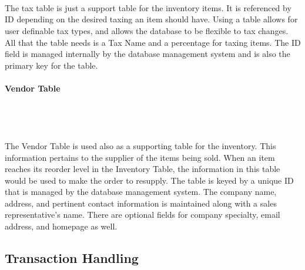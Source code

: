 \documentclass{report}
\begin{document}
    \\
    \\
    \\
    The tax table is just a support table for the inventory items. It is referenced by ID
    depending on the desired taxing an item should have. Using a table allows for user definable
    tax types, and allows the database to be flexible to tax changes. All that the table needs
    is a Tax Name and a percentage for taxing items. The ID field is managed internally by the
    database management system and is also the primary key for the table.\\
    \\
    {\bf Vendor Table}\\
    \\
    \\
    \\
    \\
    The Vendor Table is used also as a supporting table for the inventory. This information
    pertains to the supplier of the items being sold. When an item reaches its reorder level
    in the Inventory Table, the information in this table would be used to make the order to
    resupply. The table is keyed by a unique ID that is managed by the database management
    system. The company name, address, and pertinent contact information is maintained along
    with a sales representative's name. There are optional fields for company specialty, email
    address, and homepage as well.

    \subsection{Transaction Handling}
\end{document}
